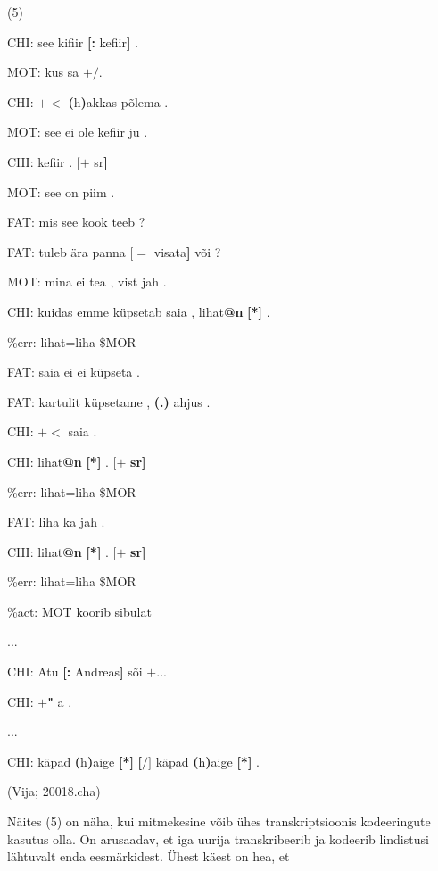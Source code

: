 \documentclass[12pt]{article}
\begin{document}
(5)
\begin{description}
    \item*CHI:   see kifiir \textbf{[:} kefiir\textbf{]} .
    \item*MOT:   kus sa $\pmb{+/}$.
    \item*CHI:   $\pmb{+<}$ \textbf{(}h\textbf{)}akkas põlema .
    \item*MOT:   see ei ole kefiir ju .
    \item*CHI:   kefiir . $\pmb{[+}$ sr\textbf{]}
    \item*MOT:   see on piim .
    \item*FAT:   mis see kook teeb ?
    \item*FAT:   tuleb ära panna $\pmb{[=}$ visata\textbf{]} või ?
    \item*MOT:   mina ei tea , vist jah .
    \item*CHI:   kuidas emme küpsetab saia , lihat\textbf{@n} \textbf{[*]} .
    \item\%err:   lihat=liha \$MOR
    \item*FAT:   saia ei ei küpseta .
    \item*FAT:   kartulit küpsetame , \textbf{(.)} ahjus .
    \item*CHI:   $\pmb{+<}$ saia .
    \item*CHI:   lihat\textbf{@n} \textbf{[*]} . $\pmb{[+}$ \textbf{sr]}
    \item\%err:   lihat=liha \$MOR
    \item*FAT:   liha ka jah .
    \item*CHI:   lihat\textbf{@n} \textbf{[*]} . $\pmb{[+}$ \textbf{sr]}
    \item\%err:   lihat=liha \$MOR
    \item\%act:   MOT koorib sibulat
    \item...
    \item*CHI:   Atu \textbf{[:} Andreas\textbf{]} sõi $\pmb{+...}$
    \item*CHI:   $\pmb{+}$\textbf{"} a .
    \item...
    \item*CHI:   käpad \textbf{(}h\textbf{)}aige \textbf{[*]} \textbf{[$\pmb{/]}$} käpad \textbf{(}h\textbf{)}aige \textbf{[*]} .
    \item (Vija; 20018.cha)
\end{description}


Näites (5) on näha, kui mitmekesine võib ühes transkriptsioonis kodeeringute kasutus olla. On arusaadav, et iga uurija transkribeerib ja kodeerib lindistusi lähtuvalt enda eesmärkidest. Ühest käest on hea, et 
\end{document}
